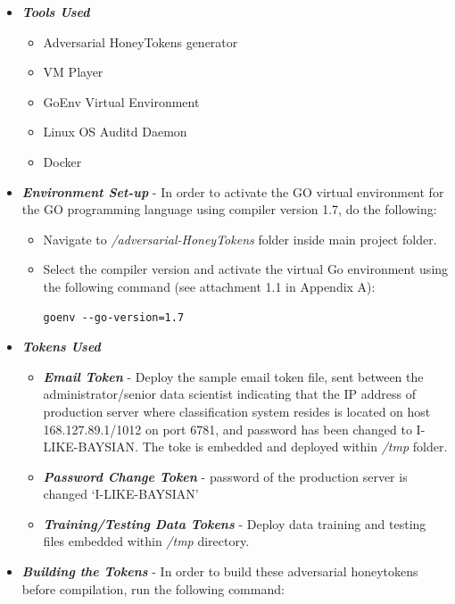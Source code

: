 \documentclass[grad,lot,lof,11pt,oneside,onehalfspace]{RUthesis}
\begin{document}
\begin{itemize}
\begin{itemize}
		\end{itemize}
		\item \textit{\textbf{Tools Used}}
		\begin{itemize}
			\item Adversarial HoneyTokens generator
			\item VM Player
			\item GoEnv Virtual Environment
			\item Linux OS Auditd Daemon
			\item Docker
		\end{itemize}
		\item \textit{\textbf{Environment Set-up}}
		- In order to activate the GO virtual environment for the GO programming language using compiler version 1.7, do the following:
		\begin{itemize}
			\item Navigate to \textit{/adversarial-HoneyTokens} folder inside main project folder. 
			\item Select the compiler version and activate the virtual Go environment using the following command (see attachment 1.1 in Appendix A):
			\begin{lstlisting}
goenv --go-version=1.7
			\end{lstlisting}
		\end{itemize}
		\item \textit{\textbf{\textbf{Tokens Used}}}
		\begin{itemize}
			\item \textit{\textbf{Email Token}} - Deploy the sample email token file, sent between the administrator/senior data scientist indicating that the IP address of production server where classification system resides is located on host 168.127.89.1/1012 on port 6781, and password has been changed to I-LIKE-BAYSIAN. The toke is embedded and deployed within \textit{/tmp} folder.
			\item \textit{\textbf{Password Change Token}} - password of the production server is changed ‘I-LIKE-BAYSIAN’
			\item \textit{\textbf{Training/Testing Data Tokens}} - Deploy data training and testing files embedded within \textit{/tmp} directory.
		\end{itemize}
		\item \textit{\textbf{Building the Tokens}}\newline
		- In order to build these adversarial honeytokens before compilation, run the following command:
		\begin{lstlisting}

\end{lstlisting}
\end{itemize}
\end{document}
